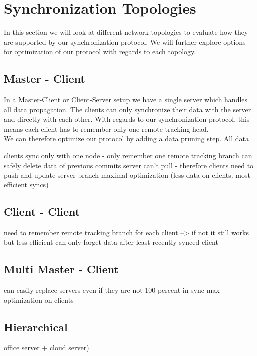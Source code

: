
\section{Synchronization Topologies}
\label{sec:histo.topologies}

In this section we will look at different network topologies to evaluate how they are supported by our synchronization protocol.
We will further explore options for optimization of our protocol with regards to each topology.\\

\subsection{Master - Client}
In a Master-Client or Client-Server setup we have a single server which handles all data propagation.
The clients can only synchronize their data with the server and directly with each other.
With regards to our synchronization protocol, this means each client has to remember only one remote tracking head.\\
We can therefore optimize our protocol by adding a data pruning step.
All data 

clients sync only with one node - only remember one remote tracking branch
can safely delete data of previous commits
server can't pull - therefore clients need to push and update server branch
maximal optimization (less data on clients, most efficient syncs)

\subsection{Client - Client}
need to remember remote tracking branch for each client
--> if not it still works but less efficient
can only forget data after least-recently synced client

\subsection{Multi Master - Client}
can easily replace servers even if they are not 100 percent in sync
max optimization on clients

\subsection{Hierarchical}
office server + cloud server)
